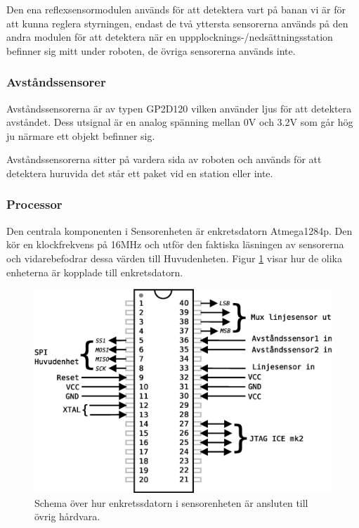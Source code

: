 Den ena reflexsensormodulen används för att detektera vart på banan vi är för att kunna reglera styrningen, endast de två yttersta sensorerna används på den andra modulen för att detektera när en uppplocknings-/nedsättningsstation befinner sig mitt under roboten, de övriga sensorerna används inte.

\subsubsection{Avståndssensorer}
Avståndssensorerna är av typen GP2D120 vilken använder ljus för att detektera avståndet. Dess utsignal är en analog spänning mellan 0V och 3.2V som går hög ju närmare ett objekt befinner sig. 

Avståndssensorerna sitter på vardera sida av roboten och används för att detektera huruvida det står ett paket vid en station eller inte.


\subsubsection{Processor}
Den centrala komponenten i Sensorenheten är enkretsdatorn Atmega1284p. Den kör en klockfrekvens på 16MHz och utför den faktiska läsningen av sensorerna och vidarebefodrar dessa värden till Huvudenheten. Figur \ref{sensor-processor} visar hur de olika enheterna är kopplade till enkretsdatorn.

\begin{figure}[h!]
	\centering
	\includegraphics[scale=0.5]{grafik/sensorenhet-processor}
	\caption{Schema över hur enkretssdatorn i sensorenheten är ansluten till övrig hårdvara.} \label{sensor-processor}
\end{figure}

